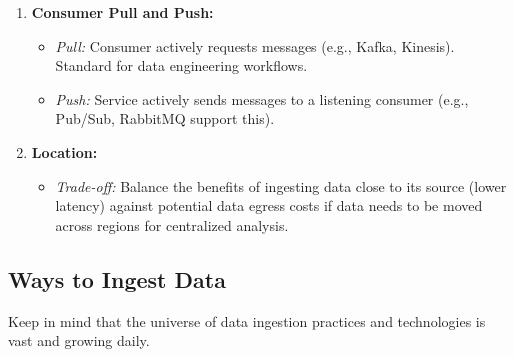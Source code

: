 \begin{enumerate}
    \item \textbf{Consumer Pull and Push:}
    \begin{itemize}[label=\textbullet]
        \item \textit{Pull:} Consumer actively requests messages (e.g., Kafka, Kinesis). Standard for data engineering workflows.
        \item \textit{Push:} Service actively sends messages to a listening consumer (e.g., Pub/Sub, RabbitMQ support this).
    \end{itemize}

    \item \textbf{Location:}
    \begin{itemize}[label=\textbullet]
        \item \textit{Trade-off:} Balance the benefits of ingesting data close to its source (lower latency) against potential data egress costs if data needs to be moved across regions for centralized analysis.
    \end{itemize}
\end{enumerate}










\subsection{Ways to Ingest Data}
Keep in mind that the universe of data ingestion practices and
technologies is vast and growing daily.

